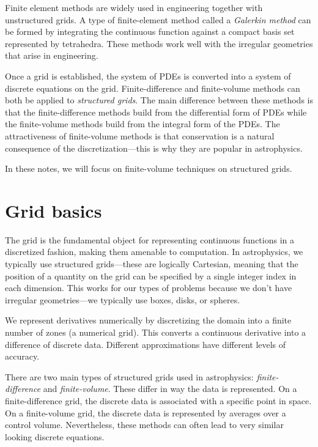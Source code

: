 \ifdefined\debugmode
Finite element methods are
widely used in engineering together with unstructured grids.  A type
of finite-element method called a {\em Galerkin method} can be formed
by integrating the continuous function against a compact basis set
represented by tetrahedra.  These methods work well with the irregular
geometries that arise in engineering.
\fi

Once a grid is established, the system of PDEs is converted into a
system of discrete equations on the grid.  Finite-difference and
finite-volume methods can both be applied to {\em structured grids}.
The main difference between these methods is that the
finite-difference methods build from the differential form of PDEs
while the finite-volume methods build from the integral form of the
PDEs.  The attractiveness of finite-volume methods is that
conservation is a natural consequence of the discretization---this is
why they are popular in astrophysics.

In these notes, we will focus on finite-volume techniques on
structured grids.


\section{Grid basics}

The grid is the fundamental object for representing continuous
functions in a discretized fashion, making them amenable to
computation.  In astrophysics, we typically use structured
grids---these are logically Cartesian, meaning that the position of a
quantity on the grid can be specified by a single integer index in
each dimension.  This works for our types of problems because
we don't have irregular geometries---we typically use boxes, disks,
or spheres.

We represent derivatives numerically by discretizing the domain into
a finite number of zones (a numerical grid).
This converts a continuous derivative into a difference of discrete data.
Different approximations have different levels of accuracy.

There are two main types of structured grids used in astrophysics:
{\em finite-difference} and {\em finite-volume}.  These differ in way
the data is represented.  On a finite-difference grid, the discrete
data is associated with a specific point in space.  On a
finite-volume grid, the discrete data is represented by averages over
a control volume.  Nevertheless, these methods can often lead to very
similar looking discrete equations.

